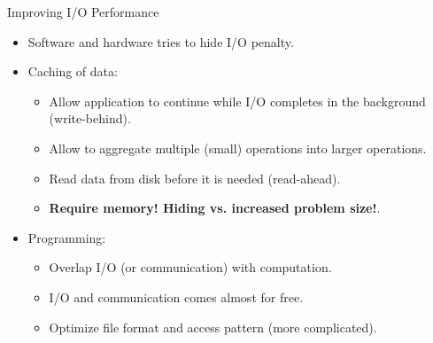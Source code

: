 \documentclass[compress,11pt,xcolor=svgnames,aspectratio=169]{beamer}
\begin{document}
\begin{frame}[fragile]{Improving I/O Performance}

\begin{itemize}
\setlength\itemsep{0.3cm}

\item Software and hardware tries to hide I/O penalty.

\item Caching of data:

  \begin{itemize}
  \setlength\itemsep{0.3cm}
    \item Allow application to continue while I/O completes in the background (write-behind).
    \item Allow to aggregate multiple (small) operations into larger operations.
    \item Read data from disk before it is needed (read-ahead).
    \item \textbf{Require memory! Hiding vs. increased problem size!}.
  \end{itemize}

\item Programming:

  \begin{itemize}
  \setlength\itemsep{0.3cm}
    \item Overlap I/O (or communication) with computation.
    \item I/O and communication comes almost for free.
    \item Optimize file format and access pattern (more complicated).
  \end{itemize}

\end{itemize}

\end{frame}
\end{document}
